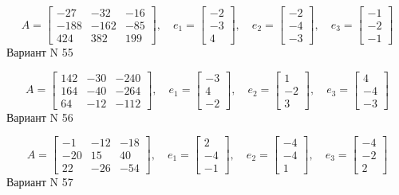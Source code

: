 \documentclass[11pt]{report}
\begin{document}
$$A = \left[\begin{matrix}-27 & -32 & -16\\-188 & -162 & -85\\424 & 382 & 199\end{matrix}\right],\quad e_1 = \left[\begin{matrix}-2\\-3\\4\end{matrix}\right],\quad e_2 = \left[\begin{matrix}-2\\-4\\-3\end{matrix}\right],\quad e_3 = \left[\begin{matrix}-1\\-2\\-1\end{matrix}\right]$$Вариант N 55

$$A = \left[\begin{matrix}142 & -30 & -240\\164 & -40 & -264\\64 & -12 & -112\end{matrix}\right],\quad e_1 = \left[\begin{matrix}-3\\4\\-2\end{matrix}\right],\quad e_2 = \left[\begin{matrix}1\\-2\\3\end{matrix}\right],\quad e_3 = \left[\begin{matrix}4\\-4\\-3\end{matrix}\right]$$Вариант N 56

$$A = \left[\begin{matrix}-1 & -12 & -18\\-20 & 15 & 40\\22 & -26 & -54\end{matrix}\right],\quad e_1 = \left[\begin{matrix}2\\-4\\-1\end{matrix}\right],\quad e_2 = \left[\begin{matrix}-4\\-4\\1\end{matrix}\right],\quad e_3 = \left[\begin{matrix}-4\\-2\\2\end{matrix}\right]$$Вариант N 57
\end{document}
